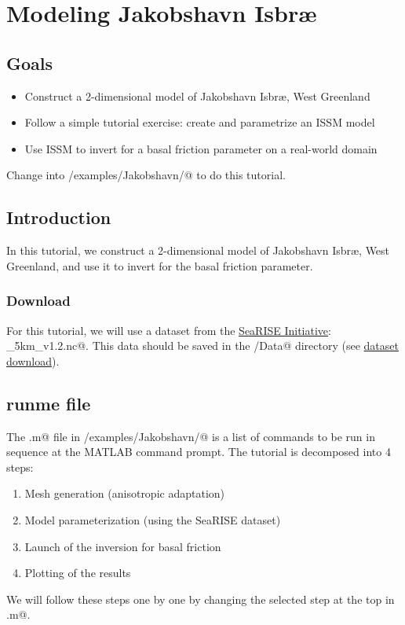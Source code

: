 \section{Modeling Jakobshavn Isbr\ae}
\subsection{Goals} %
\begin{itemize}
	\item Construct a 2-dimensional model of Jakobshavn Isbr\ae, West Greenland
	\item Follow a simple tutorial exercise: create and parametrize an ISSM model
	\item Use ISSM to invert for a basal friction parameter on a real-world domain
\end{itemize}

Change into \verb@trunk/examples/Jakobshavn/@ to do this tutorial.

\subsection{Introduction}
In this tutorial, we construct a 2-dimensional model of Jakobshavn Isbr\ae, West Greenland, and use it to invert for the basal friction parameter.

\subsubsection{Download}
For this tutorial, we will use a dataset from the \href{https://scholarworks.umt.edu/cgi/viewcontent.cgi?params=/context/cs_pubs/article/1020/&path_info=Ice_sheet_model.pdf}{SeaRISE Initiative}: \verb@Greenland_5km_v1.2.nc@. This data should be saved in the \verb@examples/Data@ directory (see \href{https://issm.jpl.nasa.gov/documentation/tutorials/datasets/}{dataset download}).

\subsection{runme file}
The \verb@runme.m@ file in \verb@trunk/examples/Jakobshavn/@ is a list of commands to be run in sequence at the MATLAB command prompt. The tutorial is decomposed into 4 steps:
\begin{enumerate}
	\item Mesh generation (anisotropic adaptation)
	\item Model parameterization (using the SeaRISE dataset)
	\item Launch of the inversion for basal friction
	\item Plotting of the results
\end{enumerate}
We will follow these steps one by one by changing the selected step at the top in \verb@runme.m@.

